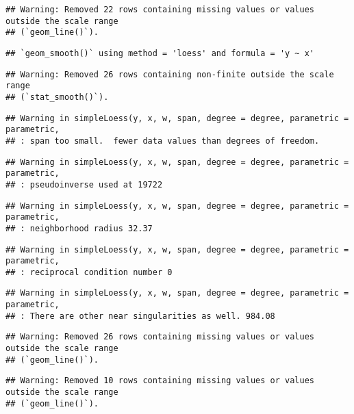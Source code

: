 \documentclass[
]{article}
\begin{document}
\begin{verbatim}
## Warning: Removed 22 rows containing missing values or values outside the scale range
## (`geom_line()`).
\end{verbatim}

\begin{verbatim}
## `geom_smooth()` using method = 'loess' and formula = 'y ~ x'
\end{verbatim}

\begin{verbatim}
## Warning: Removed 26 rows containing non-finite outside the scale range
## (`stat_smooth()`).
\end{verbatim}

\begin{verbatim}
## Warning in simpleLoess(y, x, w, span, degree = degree, parametric = parametric,
## : span too small.  fewer data values than degrees of freedom.
\end{verbatim}

\begin{verbatim}
## Warning in simpleLoess(y, x, w, span, degree = degree, parametric = parametric,
## : pseudoinverse used at 19722
\end{verbatim}

\begin{verbatim}
## Warning in simpleLoess(y, x, w, span, degree = degree, parametric = parametric,
## : neighborhood radius 32.37
\end{verbatim}

\begin{verbatim}
## Warning in simpleLoess(y, x, w, span, degree = degree, parametric = parametric,
## : reciprocal condition number 0
\end{verbatim}

\begin{verbatim}
## Warning in simpleLoess(y, x, w, span, degree = degree, parametric = parametric,
## : There are other near singularities as well. 984.08
\end{verbatim}

\begin{verbatim}
## Warning: Removed 26 rows containing missing values or values outside the scale range
## (`geom_line()`).
\end{verbatim}

\begin{verbatim}
## Warning: Removed 10 rows containing missing values or values outside the scale range
## (`geom_line()`).
\end{verbatim}
\end{document}
